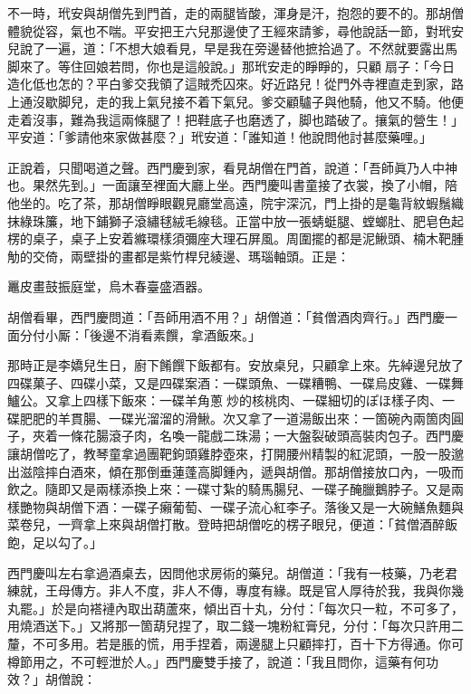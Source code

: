 不一時，玳安與胡僧先到門首，走的兩腿皆酸，渾身是汗，抱怨的要不的。那胡僧體貌從容，氣也不喘。平安把王六兒那邊使了王經來請爹，尋他說話一節，對玳安兒說了一遍，道：「不想大娘看見，早是我在旁邊替他摭拾過了。不然就要露出馬脚來了。等住回娘若問，你也是這般說。」那玳安走的睜睜的，只顧𢵞扇子：「今日造化低也怎的？平白爹交我領了這賊禿囚來。好近路兒！從門外寺裡直走到家，路上通沒歇脚兒，走的我上氣兒接不着下氣兒。爹交顧驢子與他騎，他又不騎。他便走着沒事，難為我這兩條腿了！把鞋底子也磨透了，脚也踏破了。攘氣的營生！」平安道：「爹請他來家做甚麼？」玳安道：「誰知道！他說問他討甚麼藥哩。」

正說着，只聞喝道之聲。西門慶到家，看見胡僧在門首，說道：「吾師眞乃人中神也。果然先到。」一面讓至裡面大廳上坐。西門慶叫書童接了衣裳，換了小帽，陪他坐的。吃了茶，那胡僧睜眼觀見廳堂高遠，院宇深沉，門上掛的是龜背紋蝦鬚織抹綠珠簾，地下鋪獅子滾繡毬絨毛線毯。正當中放一張蜻蜓腿、螳螂肚、肥皂色起楞的桌子，桌子上安着縧環樣須彌座大理石屏風。周圍擺的都是泥鰍頭、楠木靶腫觔的交倚，兩壁掛的畫都是紫竹桿兒綾邊、瑪瑙軸頭。{}正是：

\begin{myquote} 
鼉皮畫鼓振庭堂，烏木春臺盛酒器。
\end{myquote} 

胡僧看畢，西門慶問道：「吾師用酒不用？」胡僧道：「貧僧酒肉齊行。」西門慶一面分付小厮：「後邊不消看素饌，拿酒飯來。」

那時正是李嬌兒生日，廚下餚饌下飯都有。安放桌兒，只顧拿上來。先綽邊兒放了四碟菓子、四碟小菜，又是四碟案酒：一碟頭魚、一碟糟鴨、一碟烏皮雞、一碟舞鱸公。又拿上四樣下飯來：一碟羊角蔥𤆑炒的核桃肉、一碟細切的ぽほ樣子肉、一碟肥肥的羊貫腸、一碟光溜溜的滑鰍。次又拿了一道湯飯出來：一箇碗內兩箇肉圓子，夾着一條花腸滾子肉，名喚一龍戲二珠湯；一大盤裂破頭高裝肉包子。西門慶讓胡僧吃了，教琴童拿過團靶鉤頭雞脖壺來，打開腰州精製的紅泥頭，一股一股邈出滋陰摔白酒來，傾在那倒垂蓮蓬高脚鍾內，遞與胡僧。那胡僧接放口內，一吸而飲之。隨即又是兩樣添換上來：一碟寸紮的騎馬腸兒、一碟子醃臘鵝脖子。又是兩樣艷物與胡僧下酒：一碟子癩葡萄、一碟子流心紅李子。落後又是一大碗鱔魚麵與菜卷兒，一齊拿上來與胡僧打散。登時把胡僧吃的楞子眼兒，便道：「貧僧酒醉飯飽，足以勾了。」

西門慶叫左右拿過酒桌去，因問他求房術的藥兒。胡僧道：「我有一枝藥，乃老君練就，王母傳方。非人不度，非人不傳，專度有緣。既是官人厚待於我，我與你幾丸罷。」於是向褡褳內取出葫蘆來，傾出百十丸，分付：「每次只一粒，不可多了，用燒酒送下。」又將那一箇葫兒捏了，取二錢一塊粉紅膏兒，分付：「每次只許用二釐，不可多用。若是脹的慌，用手捏着，兩邊腿上只顧摔打，百十下方得通。你可樽節用之，不可輕泄於人。」西門慶雙手接了，說道：「我且問你，這藥有何功效？」胡僧說：

